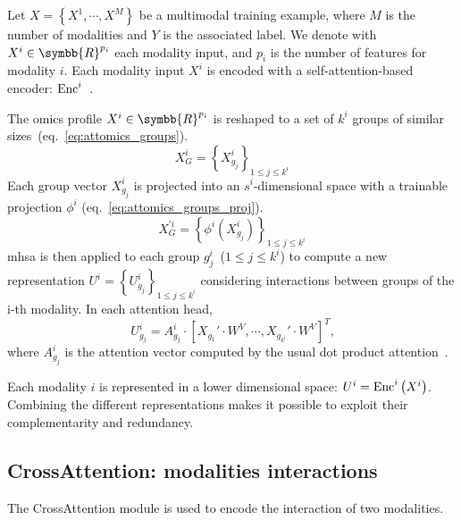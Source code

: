 \documentclass[../main.tex]{subfiles}
\begin{document}
     Let \( X = \left\{X^{1}, \cdots, X^{M} \right\} \) be a multimodal training example, where \(M\) is the number of modalities and \(Y\) is the associated label.
     We denote with \(X^{i} \in \symbb{R}^{p_i}\) each modality input, and $p_i$ is the number of features for modality $i$.
     Each modality input \(X^{i}\) is encoded with a self-attention-based encoder: \(\operatorname{Enc}^{i}\)~\cite{AttOmics}.

     The omics profile \(X^{i} \in \symbb{R}^{p_i} \) is reshaped to a set of $k^i$ groups of similar sizes~(eq.~\ref{eq:attomics_groups}).
     \begin{equation}
         X^{i}_{G} = \left\{X^{i}_{g_j} \right\}_{1\leq j\leq k^i}\label{eq:attomics_groups}
     \end{equation}
     Each group vector $X^{i}_{g_j}$ is projected into an $s^i$-dimensional space with a trainable projection \(\phi^i\) (eq.~\ref{eq:attomics_groups_proj}).
     \begin{equation}
         X^{'i}_{G} = \left\{\phi^i\left(X^{i}_{g_j} \right) \right\}_{1\leq j\leq k^i}\label{eq:attomics_groups_proj}
     \end{equation}
     \Gls{mhsa} is then applied to each group \(g^i_j\)~(\(1 \leq j \leq k^i \)) to compute a new representation \({U^i = \left\{ U^i_{g_j}\right\}_{1 \leq j \leq k^i}}\) considering interactions between groups of the i-th modality.
     In each attention head,
     \begin{equation}
         U^{i}_{g_j} = A^{i}_{g_j} \cdot \left[ X_{g_1}' \cdot W^V, \cdots ,  X_{g_{k^i}}' \cdot W^V\right]^T \text{,}\label{eq:enc_mhsa}
     \end{equation}
     where $A^{i}_{g_j}$ is the attention vector computed by the usual dot product attention~\cite{AttentionAllYouNeed}.

     Each modality $i$ is represented in a lower dimensional space: \(U^{i} = \operatorname{Enc}^{i}\left(X^{i}\right)\).
     Combining the different representations makes it possible to exploit their complementarity and redundancy.

 \subsection{CrossAttention: modalities interactions}
     The CrossAttention module is used to encode the interaction of two modalities.
\end{document}
